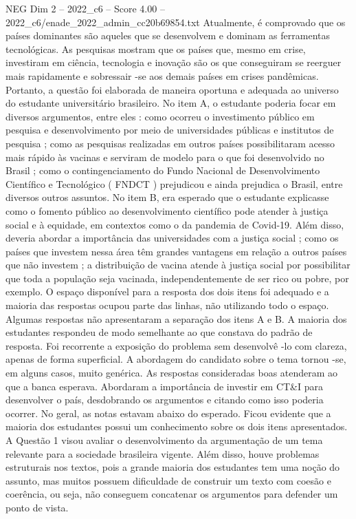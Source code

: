 \begin{textsample}{NEG Dim 2 – 2022\_c6 – Score 4.00 – 2022\_c6/enade\_2022\_admin\_cc20b69854.txt}
Atualmente, é comprovado que os países dominantes são aqueles que se desenvolvem e dominam as ferramentas tecnológicas.
As pesquisas mostram que os países que, mesmo em crise, investiram em ciência, tecnologia e inovação são os que conseguiram se reerguer mais rapidamente e sobressair -se aos demais países em crises pandêmicas.
Portanto, a questão foi elaborada de maneira oportuna e adequada ao universo do estudante universitário brasileiro.
No item A, o estudante poderia focar em diversos argumentos, entre eles : como ocorreu o investimento público em pesquisa e desenvolvimento por meio de universidades públicas e institutos de pesquisa ; como as pesquisas realizadas em outros países possibilitaram acesso mais rápido às vacinas e serviram de modelo para o que foi desenvolvido no Brasil ; como o contingenciamento do Fundo Nacional de Desenvolvimento Científico e Tecnológico ( FNDCT ) prejudicou e ainda prejudica o Brasil, entre diversos outros assuntos.
No item B, era esperado que o estudante explicasse como o fomento público ao desenvolvimento científico pode atender à justiça social e à equidade, em contextos como o da pandemia de Covid-19.
Além disso, deveria abordar a importância das universidades com a justiça social ; como os países que investem nessa área têm grandes vantagens em relação a outros países que não investem ; a distribuição de vacina atende à justiça social por possibilitar que toda a população seja vacinada, independentemente de ser rico ou pobre, por exemplo.
O espaço disponível para a resposta dos dois itens foi adequado e a maioria das respostas ocupou parte das linhas, não utilizando todo o espaço.
Algumas respostas não apresentaram a separação dos itens A e B.
A maioria dos estudantes respondeu de modo semelhante ao que constava do padrão de resposta.
Foi recorrente a exposição do problema sem desenvolvê -lo com clareza, apenas de forma superficial.
A abordagem do candidato sobre o tema tornou -se, em alguns casos, muito genérica.
As respostas consideradas boas atenderam ao que a banca esperava.
Abordaram a importância de investir em CT\&I para desenvolver o país, desdobrando os argumentos e citando como isso poderia ocorrer.
No geral, as notas estavam abaixo do esperado.
Ficou evidente que a maioria dos estudantes possui um conhecimento sobre os dois itens apresentados.
A Questão 1 visou avaliar o desenvolvimento da argumentação de um tema relevante para a sociedade brasileira vigente.
Além disso, houve problemas estruturais nos textos, pois a grande maioria dos estudantes tem uma noção do assunto, mas muitos possuem dificuldade de construir um texto com coesão e coerência, ou seja, não conseguem concatenar os argumentos para defender um ponto de vista.

\end{textsample}

